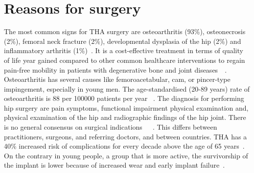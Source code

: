 \documentclass[whitelogo]{tudelft-report}
\begin{document}
{\section{Reasons for surgery}
The most common signs for THA surgery are osteoarthritis
(93\%), osteonecrosis (2\%), femoral neck fracture (2\%), developmental dysplasia of the hip (2\%) and inflammatory arthritis (1\%)~\cite{pivec2012hip}. It is a cost-effective treatment in terms of quality of life year gained compared to other common healthcare interventions to regain pain-free mobility in patients with degenerative bone and joint diseases~\cite{holzwarth2012total}~\cite{bozic2004economic}. Osteoarthritis has several causes like femoroacetabular, cam, or pincer-type impingement, especially in young men. The age-standardised (20-89 years) rate of osteoarthritis is 88 per 100000 patients per year ~\cite{oliveria1995incidence}. The diagnosis for performing hip surgery are pain symptoms, functional impairment physical examination and, physical examination of the hip and radiographic findings of the hip joint. There is no general consensus on surgical indications~\cite{pivec2012hip}~\cite{crawford1997total}~\cite{dreinhofer2006indications}. This differs between practitioners, surgeons, and referring doctors, and between countries. THA has a 40\% increased risk of complications for every decade above the age of 65 years~\cite{keener2003twenty}. On the contrary in young people, a group that is more active, the survivorship of the implant is lower because of increased wear and early implant failure~\cite{keener2003twenty}.

}
\end{document}
